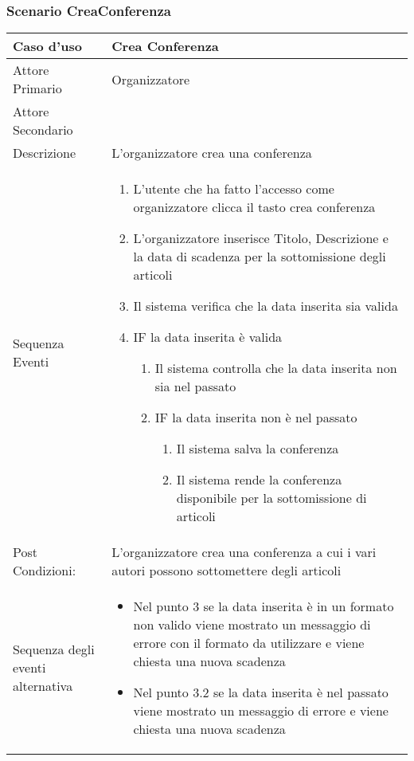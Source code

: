 \subsubsection{Scenario CreaConferenza}
\begin{tabular}{|p{3cm}|p{7cm}|}
\hline 
\rowcolor{Orchid}
Caso d'uso & Crea Conferenza \\
\hline
Attore Primario & Organizzatore\\
\hline
Attore Secondario & \\
\hline
Descrizione & L'organizzatore crea una conferenza \\
\hline
  Sequenza Eventi &
                    \begin{enumerate}
                      \item L'utente che ha fatto l'accesso come organizzatore clicca il tasto crea conferenza
                      \item L'organizzatore inserisce Titolo, Descrizione e la data di scadenza per la sottomissione degli articoli
                      \item Il sistema verifica che la data inserita sia valida
                      \item IF la data inserita è valida
                      \begin{enumerate}
                        \item Il sistema controlla che la data inserita non sia nel passato
                        \item IF la data inserita non è nel passato
                        \begin{enumerate}
                          \item Il sistema salva la conferenza
                          \item Il sistema rende la conferenza disponibile per la sottomissione di articoli
                        \end{enumerate}
                      \end{enumerate}
                    \end{enumerate}\\
\hline
Post Condizioni: & L'organizzatore crea una conferenza a cui i vari autori possono sottomettere degli articoli \\
\hline
Sequenza degli eventi alternativa &
                                    \begin{itemize}
                                      \item Nel punto 3 se la data inserita è in un formato non valido viene mostrato un messaggio di errore con il formato da utilizzare e viene chiesta una nuova scadenza
                                      \item Nel punto 3.2 se la data inserita è nel passato viene mostrato un messaggio di errore e viene chiesta una nuova scadenza
                                      \end{itemize}\\
\hline
\end{tabular}\\
